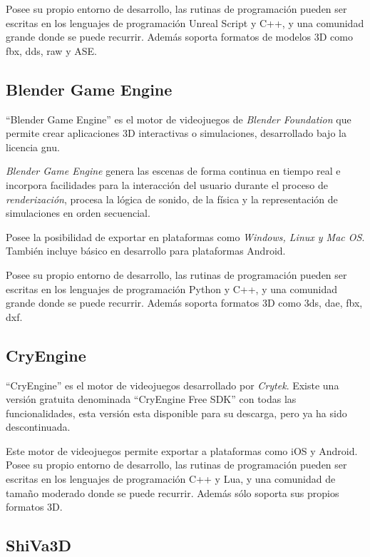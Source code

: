 Posee su propio entorno de desarrollo, las rutinas de programación pueden ser escritas 
en los lenguajes de programación Unreal Script y C++, y una comunidad 
grande donde se puede recurrir. Además soporta formatos de modelos 
3D como fbx, dds, raw y ASE\cite{unrealengine}.

\subsection{Blender Game Engine}

\enquote{Blender Game Engine} es el motor de videojuegos de \textit{Blender Foundation} 
que permite crear aplicaciones 3D interactivas o simulaciones, desarrollado bajo 
la licencia \Gls{gnu}\cite{blender}.

\textit{Blender Game Engine} genera las escenas de forma continua en tiempo real
e incorpora facilidades para la interacción del usuario durante el proceso de
\textit{renderización}, procesa la lógica de sonido, de la física y la 
representación de simulaciones en orden secuencial\cite{blender}.

Posee la posibilidad de exportar en plataformas como
\textit{Windows, Linux y Mac OS}. También incluye básico en desarrollo para 
plataformas Android\cite{blender}.

Posee su propio entorno de desarrollo, las rutinas de programación pueden ser 
escritas en los lenguajes de programación Python y C++, y
una comunidad grande donde se puede recurrir. Además soporta formatos 3D 
como 3ds, dae, fbx, dxf\cite{blender}.

\subsection{CryEngine}

\enquote{CryEngine} es el motor de videojuegos desarrollado por \textit{Crytek}.
Existe una versión gratuita denominada \enquote{CryEngine Free SDK} con todas
las funcionalidades, esta versión esta disponible para su descarga, pero ya ha
sido descontinuada\cite{cryengine:sdk}.

Este motor de videojuegos permite exportar a plataformas como iOS y
Android\cite{cryengine}. Posee su propio entorno de desarrollo, las rutinas de
programación pueden ser escritas en los lenguajes de programación C++ y Lua, y
una comunidad de tamaño moderado donde se puede recurrir. Además sólo soporta
sus propios formatos 3D\cite{cryengine}.

\subsection{ShiVa3D}


